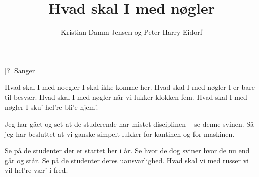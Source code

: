 \documentclass[a4paper,11pt]{article}
\title{Hvad skal I med nøgler}
\author{Kristian Damm Jensen og Peter Harry Eidorf}
\begin{document}
\maketitle

\begin{roles}
[?] Sanger
\end{roles}

\begin{song}

Hvad skal I med noegler
I skal ikke komme her.
Hvad skal I med nøgler
I er bare til besvær.
Hvad skal I med nøgler
når vi lukker klokken fem.
Hvad skal I med nøgler
I sku' hel're bli'e hjem'.


Jeg har gået og set
at de studerende har
mistet disciplinen
-- se denne svinen.
Så jeg har besluttet
at vi ganske simpelt
lukker for kantinen
og for maskinen.

Se på de studenter
der er startet her i år.
Se hvor de dog sviner
hvor de nu end går og står.
Se på de studenter
deres uansvarlighed.
Hvad skal vi med russer
vi vil hel're vær' i fred.

\end{song}
\end{document}
